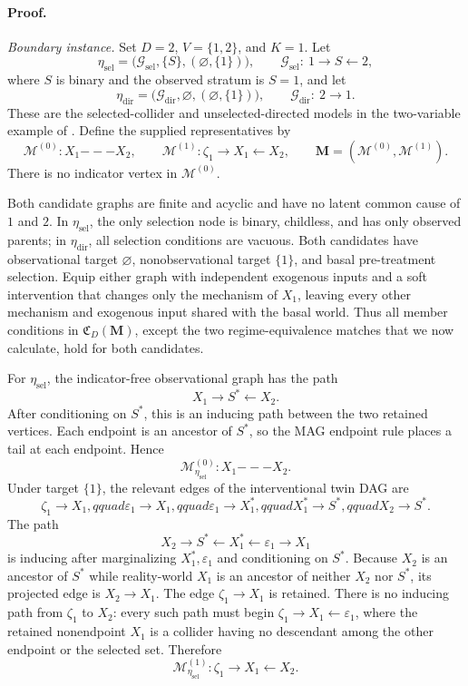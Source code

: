 \paragraph{Proof.}
\emph{Boundary instance.}
Set \(D=2\), \(V=\{1,2\}\), and \(K=1\).  Let
\[
 \eta_{\mathrm{sel}}
 =\bigl(\mathcal G_{\mathrm{sel}},\{S\},(\varnothing,\{1\})\bigr),
 \qquad
 \mathcal G_{\mathrm{sel}}:\ 1\longrightarrow S\longleftarrow2,
\]
where \(S\) is binary and the observed stratum is \(S=1\), and let
\[
 \eta_{\mathrm{dir}}
 =\bigl(\mathcal G_{\mathrm{dir}},\varnothing,(\varnothing,\{1\})\bigr),
 \qquad
 \mathcal G_{\mathrm{dir}}:\ 2\longrightarrow1.
\]
These are the selected-collider and unselected-directed models in the two-variable example of \cite{DaiEtAl2025SelectionIntervention}.  Define the supplied representatives by
\[
 \mathcal M^{(0)}: X_1\mathbin{---}X_2,
 \qquad
 \mathcal M^{(1)}:
 \zeta_1\longrightarrow X_1\longleftarrow X_2,
 \qquad
 \mathbf M=(\mathcal M^{(0)},\mathcal M^{(1)}).
\]
There is no indicator vertex in \(\mathcal M^{(0)}\).

Both candidate graphs are finite and acyclic and have no latent common cause of \(1\) and \(2\).  In \(\eta_{\mathrm{sel}}\), the only selection node is binary, childless, and has only observed parents; in \(\eta_{\mathrm{dir}}\), all selection conditions are vacuous.  Both candidates have observational target \(\varnothing\), nonobservational target \(\{1\}\), and basal pre-treatment selection.  Equip either graph with independent exogenous inputs and a soft intervention that changes only the mechanism of \(X_1\), leaving every other mechanism and exogenous input shared with the basal world.  Thus all member conditions in \(\mathfrak C_D(\mathbf M)\), except the two regime-equivalence matches that we now calculate, hold for both candidates.

For \(\eta_{\mathrm{sel}}\), the indicator-free observational graph has the path
\[
 X_1\longrightarrow S^*\longleftarrow X_2.
\]
After conditioning on \(S^*\), this is an inducing path between the two retained vertices.  Each endpoint is an ancestor of \(S^*\), so the MAG endpoint rule places a tail at each endpoint.  Hence
\[
 \mathcal M_{\eta_{\mathrm{sel}}}^{(0)}:
 X_1\mathbin{---}X_2. \tag{1}
\]
Under target \(\{1\}\), the relevant edges of the interventional twin DAG are
\[
 \zeta_1\to X_1,qquad
 \varepsilon_1\to X_1,qquad
 \varepsilon_1\to X_1^*,qquad
 X_1^*\to S^*,qquad
 X_2\to S^*.
\]
The path
\[
 X_2\to S^*\leftarrow X_1^*\leftarrow\varepsilon_1\to X_1
\]
is inducing after marginalizing \(X_1^*,\varepsilon_1\) and conditioning on \(S^*\).  Because \(X_2\) is an ancestor of \(S^*\) while reality-world \(X_1\) is an ancestor of neither \(X_2\) nor \(S^*\), its projected edge is \(X_2\to X_1\).  The edge \(\zeta_1\to X_1\) is retained.  There is no inducing path from \(\zeta_1\) to \(X_2\): every such path must begin \(\zeta_1\to X_1\leftarrow\varepsilon_1\), where the retained nonendpoint \(X_1\) is a collider having no descendant among the other endpoint or the selected set.  Therefore
\[
 \mathcal M_{\eta_{\mathrm{sel}}}^{(1)}:
 \zeta_1\longrightarrow X_1\longleftarrow X_2. \tag{2}
\]

